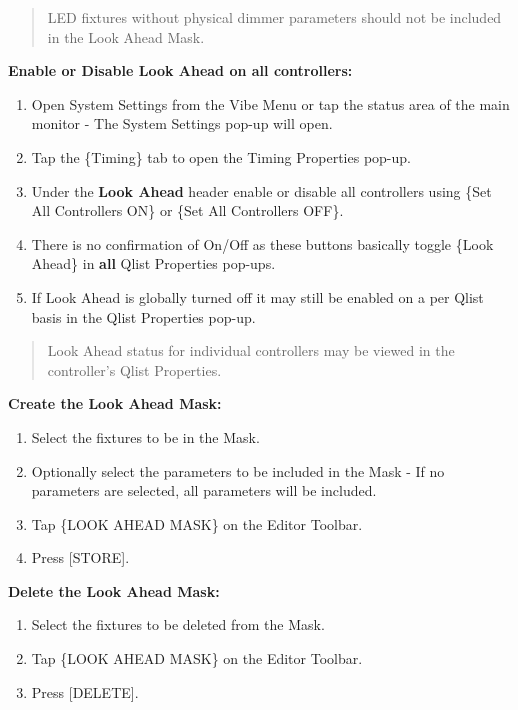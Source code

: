 \documentclass[
]{article}
\begin{document}
\begin{quote}
{LED fixtures without physical dimmer parameters should not be included in the Look Ahead Mask.
}
\end{quote}

\textbf{Enable or Disable Look Ahead on all controllers:}

\begin{enumerate}
\def\labelenumi{\arabic{enumi}.}
\item
  Open System Settings from the Vibe Menu or tap the status area of the main monitor - The System Settings pop-up will open.
\item
  Tap the \{Timing\} tab to open the Timing Properties pop-up.
\item
  Under the \textbf{Look Ahead} header enable or disable all controllers using \{Set All Controllers ON\} or \{Set All Controllers OFF\}.
\item
  There is no confirmation of On/Off as these buttons basically toggle \{Look Ahead\} in \textbf{all} Qlist Properties pop-ups.
\item
  If Look Ahead is globally turned off it may still be enabled on a per Qlist basis in the Qlist Properties pop-up.
\end{enumerate}

\begin{quote}
Look Ahead status for individual controllers may be viewed in the controller's Qlist Properties.
\end{quote}

\textbf{Create the Look Ahead Mask:}

\begin{enumerate}
\def\labelenumi{\arabic{enumi}.}
\item
  Select the fixtures to be in the Mask.
\item
  Optionally select the parameters to be included in the Mask - If no parameters are selected, all parameters will be included.
\item
  Tap \{LOOK AHEAD MASK\} on the Editor Toolbar.
\item
  Press {[}STORE{]}.
\end{enumerate}

\textbf{Delete the Look Ahead Mask:}

\begin{enumerate}
\def\labelenumi{\arabic{enumi}.}
\item
  Select the fixtures to be deleted from the Mask.
\item
  Tap \{LOOK AHEAD MASK\} on the Editor Toolbar.
\item
  Press {[}DELETE{]}.
\end{enumerate}
\end{document}
